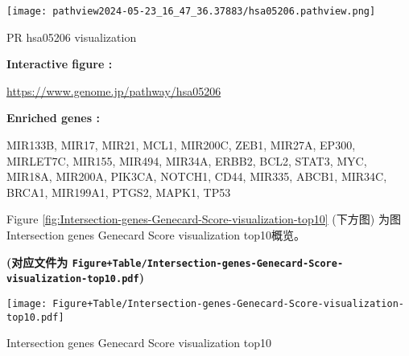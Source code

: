 \documentclass[
]{article}
\begin{document}
\def\@captype{figure}
\begin{center}
\texttt{[image: pathview2024-05-23\_16\_47\_36.37883/hsa05206.pathview.png]}
\caption{PR hsa05206 visualization}\label{fig:PR-hsa05206-visualization}
\end{center}
\begin{center}\begin{tcolorbox}[colback=gray!10, colframe=gray!50, width=0.9\linewidth, arc=1mm, boxrule=0.5pt]
\textbf{
Interactive figure
:}

\vspace{0.5em}

    \url{https://www.genome.jp/pathway/hsa05206}

\vspace{2em}


\textbf{
Enriched genes
:}

\vspace{0.5em}

    MIR133B, MIR17, MIR21, MCL1, MIR200C, ZEB1, MIR27A,
EP300, MIRLET7C, MIR155, MIR494, MIR34A, ERBB2, BCL2,
STAT3, MYC, MIR18A, MIR200A, PIK3CA, NOTCH1, CD44, MIR335,
ABCB1, MIR34C, BRCA1, MIR199A1, PTGS2, MAPK1, TP53

\vspace{2em}
\end{tcolorbox}
\end{center}

\begin{center}\vspace{1.5cm}\end{center}

\begin{center}\vspace{1.5cm}\end{center}

Figure \ref{fig:Intersection-genes-Genecard-Score-visualization-top10} (下方图) 为图Intersection genes Genecard Score visualization top10概览。

\textbf{(对应文件为 \texttt{Figure+Table/Intersection-genes-Genecard-Score-visualization-top10.pdf})}

\def\@captype{figure}
\begin{center}
\texttt{[image: Figure+Table/Intersection-genes-Genecard-Score-visualization-top10.pdf]}
\caption{Intersection genes Genecard Score visualization top10}\label{fig:Intersection-genes-Genecard-Score-visualization-top10}
\end{center}
\end{document}
